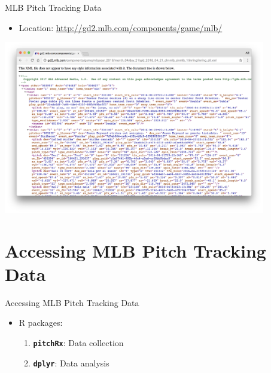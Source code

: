\begin{frame}{MLB Pitch Tracking Data}

\begin{itemize}
\tightlist
\item
  Location:
  \color{brightpink}\url{http://gd2.mlb.com/components/game/mlb/}
\end{itemize}

\vspace{-1mm}\begin{center}
\includegraphics[width = 4.5in]{../figs/gd_inning_all.png}
\end{center}

\end{frame}

\section{Accessing MLB Pitch Tracking
Data}\label{accessing-mlb-pitch-tracking-data}

\begin{frame}[fragile]{Accessing MLB Pitch Tracking Data}

\begin{itemize}
\tightlist
\item
  R packages:

  \begin{enumerate}
  \def\labelenumi{\arabic{enumi}.}
  \tightlist
  \item
    \textbf{\texttt{pitchRx}}: Data collection
  \item
    \textbf{\texttt{dplyr}}: Data analysis
  \end{enumerate}
\end{itemize}

\end{frame}

